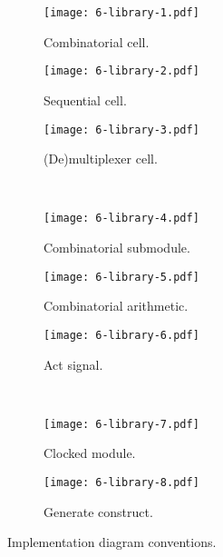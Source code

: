 \begin{figure}[h]
  \begin{subfigure}{.33\textwidth}
    \centering
    \texttt{[image: 6-library-1.pdf]}
    \caption{Combinatorial cell.}
    \label{fig:6-library-1}
  \end{subfigure}%
  \begin{subfigure}{.33\textwidth}
    \centering
    \texttt{[image: 6-library-2.pdf]}
    \caption{Sequential cell.}
    \label{fig:6-library-2}
  \end{subfigure}%
  \begin{subfigure}{.33\textwidth}
    \centering
    \texttt{[image: 6-library-3.pdf]}
    \caption{(De)multiplexer cell.}
    \label{fig:6-library-3}
  \end{subfigure}\\[1ex]
  \begin{subfigure}{.33\textwidth}
    \centering
    \texttt{[image: 6-library-4.pdf]}
    \caption{Combinatorial submodule.}
    \label{fig:6-library-4}
  \end{subfigure}%
  \begin{subfigure}{.33\textwidth}
    \centering
    \texttt{[image: 6-library-5.pdf]}
    \caption{Combinatorial arithmetic.}
    \label{fig:6-library-5}
  \end{subfigure}%
  \begin{subfigure}{.33\textwidth}
    \centering
    \texttt{[image: 6-library-6.pdf]}
    \caption{Act signal.}
    \label{fig:6-library-6}
  \end{subfigure}\\[1ex]
  \begin{subfigure}{.5\textwidth}
    \centering
    \texttt{[image: 6-library-7.pdf]}
    \caption{Clocked module.}
    \label{fig:6-library-7}
  \end{subfigure}%
  \begin{subfigure}{0.5\textwidth}
    \centering
    \texttt{[image: 6-library-8.pdf]}
    \caption{Generate construct.}
    \label{fig:6-library-8}
  \end{subfigure}
  \caption{Implementation diagram conventions.}
  \label{fig:6-library}
\end{figure}




